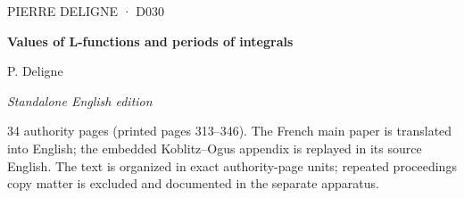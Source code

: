 \documentclass[10pt,twoside]{article}
\begin{document}
\thispagestyle{empty}
\begin{center}
\vspace*{0.16\textheight}
{\sffamily\small\color{D030Accent}PIERRE DELIGNE · D030}\par\vspace{1.2em}
{\Huge\bfseries Values of L-functions and periods of integrals}\par\vspace{1.1em}
{\Large P. Deligne}\par\vspace{2.1em}
{\large\itshape Standalone English edition}\par\vfill
\begin{minipage}{0.78\textwidth}\small\color{D030Muted}
34 authority pages (printed pages 313--346). The French main paper is translated into English; the embedded Koblitz--Ogus appendix is replayed in its source English.
The text is organized in exact authority-page units; repeated proceedings copy matter is excluded and documented in the separate apparatus.
\end{minipage}
\vspace*{0.10\textheight}
\end{center}
\clearpage
\thispagestyle{plain}
\end{document}

